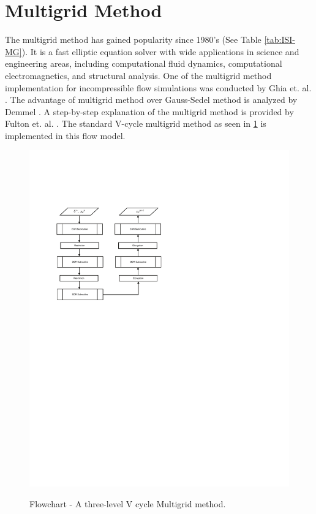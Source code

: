 \normalsize
\section{Multigrid Method}
The multigrid method has gained popularity since 1980's (See Table \ref{tab:ISI-MG}). It is a fast elliptic equation solver with wide applications in science and engineering areas, including computational fluid dynamics, computational electromagnetics, and structural analysis.
One of the multigrid method implementation for incompressible flow simulations was conducted by Ghia et. al. \cite{Ghia1982}. The advantage of multigrid method over Gauss-Sedel method is analyzed by Demmel \cite{Demmel1997}.
A step-by-step explanation of the multigrid method is provided by Fulton et. al. \cite{Fulton1986}. The standard V-cycle multigrid method as seen in \ref{fig:flowchart-Multigrid} is implemented in this flow model.
\begin{figure}[htbp]
\hspace{0.2in}
\includegraphics[width=5.2in]{../figures/flowcharts/Multigrid.pdf}
\label{fig:flowchart-Multigrid}
\caption{Flowchart - A three-level V cycle Multigrid method. }
\end{figure}



